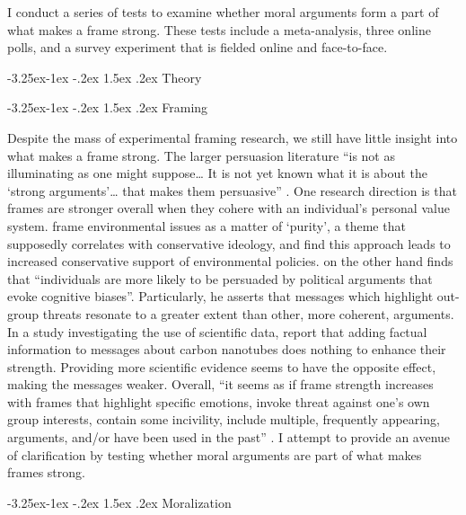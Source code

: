 \documentclass[12pt,]{article}
\makeatletter
\renewcommand\subsection{\@startsection{subsection}{2}{\z@}%
                                     {-3.25ex\@plus -1ex \@minus -.2ex}
                                     {1.5ex \@plus .2ex}
                                     {\normalsize\bfseries}} %
\renewcommand\subsubsection{\@startsection{subsubsection}{3}{\z@}
                                     {-3.25ex\@plus -1ex \@minus -.2ex}
                                     {1.5ex \@plus .2ex}
                                     {\normalsize\itshape}} %
\makeatother
\begin{document}
I conduct a series of tests to examine whether moral arguments form a
part of what makes a frame strong. These tests include a meta-analysis,
three online polls, and a survey experiment that is fielded online and
face-to-face.

\subsection{Theory}\label{framing-theory}

\subsubsection{Framing}\label{framing-theory-framing}

Despite the mass of experimental framing research, we still have little
insight into what makes a frame strong. The larger persuasion literature
``is not as illuminating as one might suppose\ldots{} It is not yet
known what it is about the `strong arguments'\ldots{} that makes them
persuasive'' \citep{okeefe_2002_persuasion}. One research direction is
that frames are stronger overall when they cohere with an individual's
personal value system. \citet{feinberg_2012_moral} frame environmental
issues as a matter of `purity', a theme that supposedly correlates with
conservative ideology, and find this approach leads to increased
conservative support of environmental policies.
\citep[p.~280]{arceneaux_cognitive_2012} on the other hand finds that
``individuals are more likely to be persuaded by political arguments
that evoke cognitive biases''. Particularly, he asserts that messages
which highlight out-group threats resonate to a greater extent than
other, more coherent, arguments. In a study investigating the use of
scientific data, \citet{druckman_framing_2011} report that adding
factual information to messages about carbon nanotubes does nothing to
enhance their strength. Providing more scientific evidence seems to have
the opposite effect, making the messages weaker. Overall, ``it seems as
if frame strength increases with frames that highlight specific
emotions, invoke threat against one's own group interests, contain some
incivility, include multiple, frequently appearing, arguments, and/or
have been used in the past'' \citep[p.~22]{druckman_political_2018}. I
attempt to provide an avenue of clarification by testing whether moral
arguments are part of what makes frames strong.

\subsubsection{Moralization}\label{framing-theory-moralization}
\end{document}
